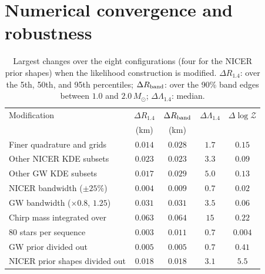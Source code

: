 \documentclass[aps,prd,twocolumn,superscriptaddress,nofootinbib,longbibliography]{revtex4-2}
\begin{document}
\section{Numerical convergence and robustness}
\label{app:numerics}

\begin{table}[tbp]
  \centering
  \caption{Largest changes over the eight configurations (four for the NICER
  prior shapes) when the likelihood
  construction is modified. $\Delta R_{1.4}$: over the 5th, 50th, and 95th
  percentiles; $\Delta R_{\rm band}$: over the 90\% band edges between $1.0$ and
  $2.0\,M_\odot$; $\Delta\Lambda_{1.4}$: median.}
  \label{tab:numerics}
  \footnotesize
  \setlength{\tabcolsep}{2.5pt}
  \begin{tabular}{@{}lcccc@{}}
    \toprule
    Modification & $\Delta R_{1.4}$ & $\Delta R_{\rm band}$ & $\Delta\Lambda_{1.4}$ & $\Delta\log\mathcal Z$ \\
     & (km) & (km) & & \\
    \midrule
    Finer quadrature and grids & $0.014$ & $0.028$ & $1.7$ & $0.15$ \\
    Other NICER KDE subsets & $0.023$ & $0.023$ & $3.3$ & $0.09$ \\
    Other GW KDE subsets & $0.017$ & $0.029$ & $5.0$ & $0.13$ \\
    NICER bandwidth ($\pm25\%$) & $0.004$ & $0.009$ & $0.7$ & $0.02$ \\
    GW bandwidth ($\times0.8$, $1.25$) & $0.031$ & $0.031$ & $3.5$ & $0.06$ \\
    Chirp mass integrated over & $0.063$ & $0.064$ & $15$ & $0.22$ \\
    $80$ stars per sequence & $0.003$ & $0.011$ & $0.7$ & $0.004$ \\
    GW prior divided out & $0.005$ & $0.005$ & $0.7$ & $0.41$ \\
    NICER prior shapes divided out & $0.018$ & $0.018$ & $3.1$ & $5.5$ \\
    \bottomrule
  \end{tabular}
\end{table}
\end{document}
